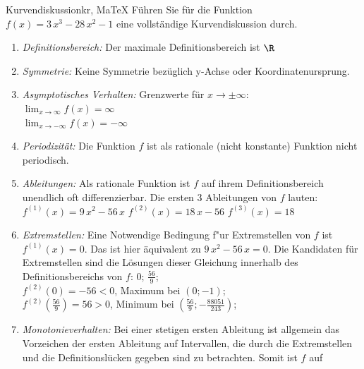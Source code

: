  \providecommand{\MoIl}{(} 
 \providecommand{\MoIr}{)}
 \providecommand{\MIntvlSep}{;} 
 \providecommand{\MElSetSep}{;} 
 \begin{MAufgabe}{Kurvendiskussion}{kr, MaTeX}
 F\"uhren Sie f\"ur die Funktion $f(x)=3\, x^3 - 28\, x^2 - 1$ eine vollst\"andige Kurvendiskussion durch.\\ 
 \ifLsg\Loesung
 \begin{enumerate}
 \item \emph{Definitionsbereich:} 
 Der maximale Definitionsbereich ist $\R$\item \emph{Symmetrie:} 
 Keine Symmetrie bez\"uglich y-Achse oder Koordinatenursprung.\item \emph{Asymptotisches Verhalten:} 
 Grenzwerte f\"ur $x\rightarrow \pm \infty$: \\ 
 $\lim_{x\rightarrow \infty} f(x)=\infty$ \\ 
 $\lim_{x\rightarrow -\infty} f(x)=- \infty$ \\ 
 \item \emph{Periodizit\"at:} 
 Die Funktion $f$ ist als rationale (nicht konstante) Funktion nicht periodisch.\item \emph{Ableitungen:} 
 Als rationale Funktion ist $f$ auf ihrem Definitionsbereich unendlich oft differenzierbar. 
 Die ersten 3 Ableitungen von $f$ lauten: \\ 
 $f^{(1)}(x)=9\, x^2 - 56\, x$\newline 
  $f^{(2)}(x)=18\, x - 56$\newline 
  $f^{(3)}(x)=18$\newline 
  \item \emph{Extremstellen:} 
 Eine Notwendige Bedingung f"ur Extremstellen von $f$ ist $f^{(1)}(x)=0$. 
 Das ist hier \"aquivalent zu $9\, x^2 - 56\, x=0$. 
 Die Kandidaten f\"ur Extremstellen sind die L\"osungen dieser Gleichung innerhalb des Definitionsbereichs von $f$: $0$; $\frac{56}{9}$; \\ 
 $f^{(2)}(0)=-56$$<0$, Maximum bei $(0;-1)$; \\ 
 $f^{(2)}(\frac{56}{9})=56$$>0$, Minimum bei $(\frac{56}{9};- \frac{88051}{243})$; \\ 
 \item \emph{Monotonieverhalten:} 
 Bei einer stetigen ersten Ableitung ist allgemein das Vorzeichen der ersten Ableitung auf Intervallen, die durch die Extremstellen und die Definitionsl\"ucken gegeben sind zu betrachten. Somit ist $f$ auf \\ 

\end{enumerate}
\end{MAufgabe}
